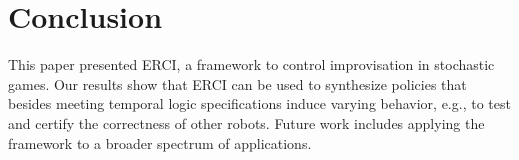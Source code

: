 \section{Conclusion}
This paper presented ERCI, a framework to control improvisation in stochastic games. Our results show that ERCI can be used to synthesize policies that besides meeting temporal logic specifications induce varying behavior, e.g., to test and certify the correctness of other robots. Future work includes applying the framework to a broader spectrum of applications.